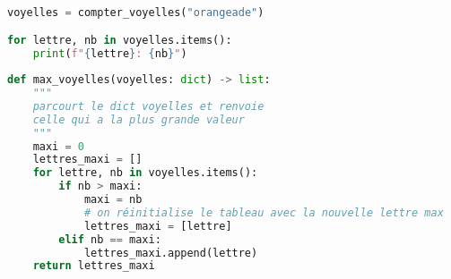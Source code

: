 \documentclass[svgnames,11pt]{beamer}
\begin{document}
\begin{frame}[fragile]
    \frametitle{}

\begin{center}
\begin{lstlisting}[language=Python , basicstyle=\ttfamily\small, xleftmargin=2em, xrightmargin=2em]
voyelles = compter_voyelles("orangeade")

for lettre, nb in voyelles.items():
    print(f"{lettre}: {nb}")
\end{lstlisting}
\label{CODE}
\end{center} 

\end{frame}
\begin{frame}[fragile]

\begin{center}
\begin{lstlisting}[language=Python , basicstyle=\ttfamily\small, xleftmargin=1em, xrightmargin=0em]
def max_voyelles(voyelles: dict) -> list:
    """
    parcourt le dict voyelles et renvoie
    celle qui a la plus grande valeur
    """
    maxi = 0
    lettres_maxi = []
    for lettre, nb in voyelles.items():
        if nb > maxi:
            maxi = nb
            # on réinitialise le tableau avec la nouvelle lettre max
            lettres_maxi = [lettre]
        elif nb == maxi:
            lettres_maxi.append(lettre)
    return lettres_maxi
\end{lstlisting}
\end{center}    
    
    \end{frame}
\end{document}
